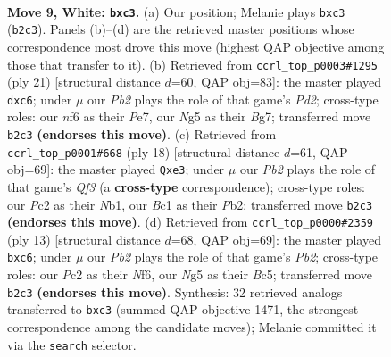 \documentclass[11pt]{article}
\begin{document}
\clearpage

\begin{figure}[p]\centering
\begin{subfigure}{0.46\textwidth}\centering
\resizebox{\linewidth}{!}{%
\newchessgame
\chessboard[
  setfen={r1bq1rk1/p1p2ppp/2pp1n2/4p1N1/4P3/2bP4/PPP2PPP/R1BQ1RK1 w - - 0 9},
  showmover=false,
  pgfstyle=straightmove, color=movearrow, markmove={b2-c3}
]}
\caption{}
\end{subfigure}\hfill
\begin{subfigure}{0.46\textwidth}\centering
\resizebox{\linewidth}{!}{%
\newchessgame
\chessboard[
  setfen={r1bq1rk1/1p1pppbp/p1B3p1/4P3/3P4/2P2N2/P4PPP/R1BQ1RK1 b - - 0 11},
  showmover=false,
  pgfstyle=straightmove, color=movearrow, markmove={d7-c6}
]}
\caption{}
\end{subfigure}
\\[4pt]
\begin{subfigure}{0.46\textwidth}\centering
\resizebox{\linewidth}{!}{%
\newchessgame
\chessboard[
  setfen={r1bq1rk1/ppp2ppp/3p1n2/4p3/P1B1P3/3PbQ2/1PP2PPP/RN3RK1 w - - 0 10},
  showmover=false,
  pgfstyle=straightmove, color=movearrow, markmove={f3-e3}
]}
\caption{}
\end{subfigure}\hfill
\begin{subfigure}{0.46\textwidth}\centering
\resizebox{\linewidth}{!}{%
\newchessgame
\chessboard[
  setfen={r1bq1rk1/ppp2ppp/2Bp1n2/2b1p3/4P3/3P1N2/PPP2PPP/RNBQR1K1 b - - 0 7},
  showmover=false,
  pgfstyle=straightmove, color=movearrow, markmove={b7-c6}
]}
\caption{}
\end{subfigure}
\caption{\textbf{Move 9, White: \texttt{bxc3}.} (a) Our position; Melanie plays \texttt{bxc3} (\texttt{b2c3}). Panels (b)--(d) are the retrieved master positions whose correspondence most drove this move (highest QAP objective among those that transfer to it). (b) Retrieved from \texttt{ccrl\_top\_p0003\#1295} (ply 21) [structural distance $d$=60, QAP obj=83]: the master played \texttt{dxc6}; under $\mu$ our \emph{Pb2} plays the role of that game's \emph{Pd2}; cross-type roles: our \emph{n}f6 as their \emph{P}e7, our \emph{N}g5 as their \emph{B}g7; transferred move \texttt{b2c3} \textbf{(endorses this move)}. (c) Retrieved from \texttt{ccrl\_top\_p0001\#668} (ply 18) [structural distance $d$=61, QAP obj=69]: the master played \texttt{Qxe3}; under $\mu$ our \emph{Pb2} plays the role of that game's \emph{Qf3} (a \textbf{cross-type} correspondence); cross-type roles: our \emph{P}c2 as their \emph{N}b1, our \emph{B}c1 as their \emph{P}b2; transferred move \texttt{b2c3} \textbf{(endorses this move)}. (d) Retrieved from \texttt{ccrl\_top\_p0000\#2359} (ply 13) [structural distance $d$=68, QAP obj=69]: the master played \texttt{bxc6}; under $\mu$ our \emph{Pb2} plays the role of that game's \emph{Pb2}; cross-type roles: our \emph{P}c2 as their \emph{N}f6, our \emph{N}g5 as their \emph{B}c5; transferred move \texttt{b2c3} \textbf{(endorses this move)}. Synthesis: 32 retrieved analogs transferred to \texttt{bxc3} (summed QAP objective 1471, the strongest correspondence among the candidate moves); Melanie committed it via the \texttt{search} selector.}
\label{fig:thought-m16}
\end{figure}
\end{document}

